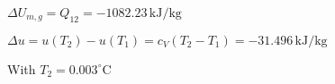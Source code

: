\( \Delta U_{m,g} = Q_{12} = -1082.23 \, \text{kJ/kg} \)  

\( \Delta u = u(T_2) - u(T_1) = c_V(T_2 - T_1) = -31.496 \, \text{kJ/kg} \)  

With \( T_2 = 0.003^\circ \text{C} \)